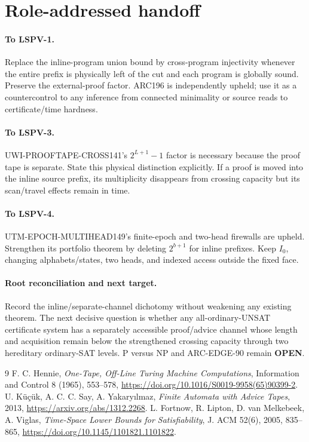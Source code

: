 \documentclass[11pt]{article}
\newcommand{\OPEN}{\textbf{OPEN}}
\begin{document}
\section{Role-addressed handoff}
\paragraph{To LSPV-1.}
Replace the inline-program union bound by cross-program injectivity whenever the entire prefix is physically left of the cut and each program is globally sound.  Preserve the external-proof factor.  ARC196 is independently upheld; use it as a countercontrol to any inference from connected minimality or source reads to certificate/time hardness.

\paragraph{To LSPV-3.}
UWI-PROOFTAPE-CROSS141's $2^{L+1}-1$ factor is necessary because the proof tape is separate.  State this physical distinction explicitly.  If a proof is moved into the inline source prefix, its multiplicity disappears from crossing capacity but its scan/travel effects remain in time.

\paragraph{To LSPV-4.}
UTM-EPOCH-MULTIHEAD149's finite-epoch and two-head firewalls are upheld.  Strengthen its portfolio theorem by deleting $2^{b+1}$ for inline prefixes.  Keep $I_0$, changing alphabets/states, two heads, and indexed access outside the fixed face.

\paragraph{Root reconciliation and next target.}
Record the inline/separate-channel dichotomy without weakening any existing theorem.  The next decisive question is whether any all-ordinary-UNSAT certificate system has a separately accessible proof/advice channel whose length and acquisition remain below the strengthened crossing capacity through two hereditary ordinary-SAT levels.  P versus NP and ARC-EDGE-90 remain \OPEN.

\begin{thebibliography}{9}
 F. C. Hennie, \emph{One-Tape, Off-Line Turing Machine Computations}, Information and Control 8 (1965), 553--578, \url{https://doi.org/10.1016/S0019-9958(65)90399-2}.
 U. K\"u\c{c}\"uk, A. C. C. Say, A. Yakary\i lmaz, \emph{Finite Automata with Advice Tapes}, 2013, \url{https://arxiv.org/abs/1312.2268}.
 L. Fortnow, R. Lipton, D. van Melkebeek, A. Viglas, \emph{Time-Space Lower Bounds for Satisfiability}, J. ACM 52(6), 2005, 835--865, \url{https://doi.org/10.1145/1101821.1101822}.
\end{thebibliography}
\end{document}
